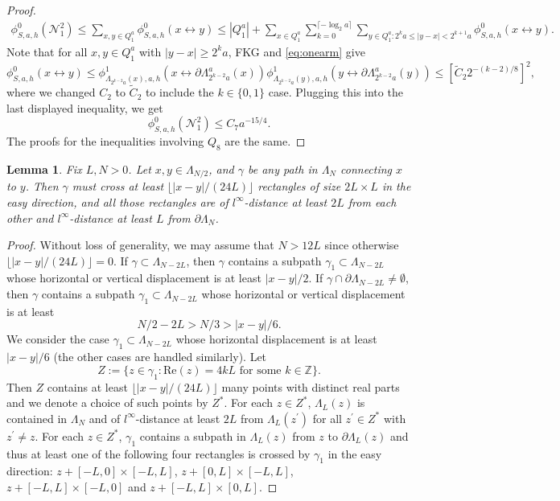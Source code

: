 \documentclass[article,12pt,reqno]{amsart}
\newtheorem{lemma}[theorem]{Lemma}
\begin{document}
\begin{proof}
\begin{align*}\phi_{S,a,h}^0(\mathcal{N}_1^2)\leq \sum_{x,y\in Q_1^a} \phi_{S,a,h}^0(x\longleftrightarrow y)\leq |Q_1^a|+\sum_{x\in Q_1^a}\sum_{k=0}^{\lceil -\log_2 a \rceil}\sum_{y\in Q_1^a: 2^{k}a\leq |y-x|<2^{k+1}a} \phi_{S,a,h}^0(x\longleftrightarrow y).
	\end{align*}
	Note that for all $x,y\in Q_1^a$ with $|y-x|\geq 2^{k}a$, FKG and \eqref{eq:onearm} give
	\[\phi_{S,a,h}^0(x\longleftrightarrow y)\leq \phi_{\Lambda_{2^{k-2}a}(x),a,h}^1(x\longleftrightarrow \partial \Lambda_{2^{k-2}a}^a(x))\phi_{\Lambda_{2^{k-2}a}(y),a,h}^1(y\longleftrightarrow \partial \Lambda_{2^{k-2}a}^a(y))\leq[\tilde{C}_2 2^{-(k-2)/8}]^2,\]
	  where we changed $C_2$ to $\tilde{C}_2$ to include the $k\in\{0,1\}$ case. Plugging this into the last displayed inequality, we get
	\[\phi_{S,a,h}^0(\mathcal{N}_1^2)\leq C_7a^{-15/4}.\]
The proofs for the inequalities involving $Q_8$ are the same.	 
\end{proof}

\begin{lemma}\label{lem:numberofdisjointR}
	Fix $L,N>0$. Let $x,y\in \Lambda_{N/2}$, and $\gamma$ be any path in $\Lambda_N$ connecting $x$ to $y$. Then $\gamma$ must cross at least $\lfloor |x-y| /(24L)\rfloor$ rectangles of size $2L\times L$ in the easy direction, and all those rectangles are of $l^{\infty}$-distance at least $2L$ from each other and $l^{\infty}$-distance at least $L$ from $\partial \Lambda_N$.
\end{lemma}
\begin{proof}
	Without loss of generality, we may assume that $N> 12L$ since otherwise $\lfloor |x-y| /(24L)\rfloor=0$. If $\gamma \subset \Lambda_{N-2L}$, then $\gamma$ contains a subpath $\gamma_1\subset \Lambda_{N-2L}$ whose horizontal or vertical displacement is at least $|x-y|/2$. If $\gamma \cap \partial \Lambda_{N-2L} \neq \emptyset$, then $\gamma$ contains a subpath $\gamma_1\subset \Lambda_{N-2L}$ whose horizontal or vertical displacement is at least
    \[N/2-2L > N/3 >|x-y|/6.\]
    We consider the case $\gamma_1\subset \Lambda_{N-2L}$ whose horizontal displacement is at least $|x-y|/6$ (the other cases are handled similarly). Let
    \[Z:=\{z\in \gamma_1: \text{Re}(z)=4kL \text{ for some } k\in \mathbb{Z}\}.\]
    Then $Z$ contains at least $\lfloor |x-y| /(24L)\rfloor$ many points with distinct real parts and we denote a choice of such points by $Z^*$. For each $z\in Z^*$, $\Lambda_L(z)$ is contained in $\Lambda_N$ and of $l^{\infty}$-distance at least $2L$ from $\Lambda_L(z^{\prime})$ for all $z^{\prime} \in Z^*$ with $z^{\prime} \neq z$. For each $z\in Z^*$, $\gamma_1$ contains a subpath in $\Lambda_L(z)$ from $z$ to $\partial \Lambda_L(z)$ and thus at least one of the following four rectangles is crossed by $\gamma_1$ in the easy direction: $z+[-L,0]\times [-L,L]$, $z+[0,L]\times [-L,L]$, $z+[-L,L]\times [-L,0]$ and $z+[-L,L]\times [0,L]$.
\end{proof}
\end{document}
